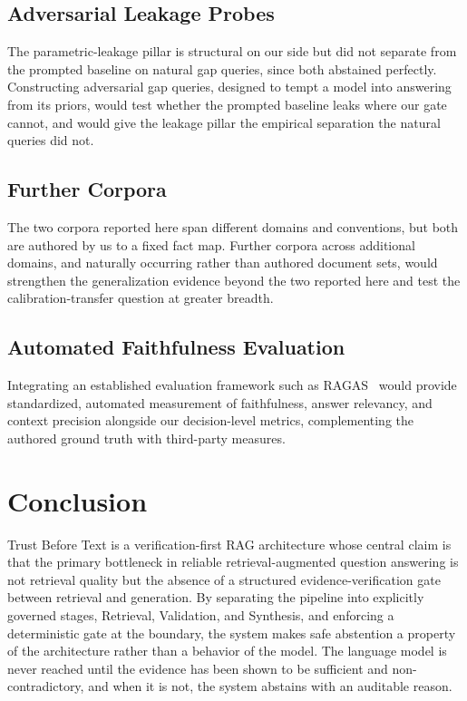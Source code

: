 \documentclass[conference]{IEEEtran}
\begin{document}
\subsection{Adversarial Leakage Probes}
The parametric-leakage pillar is structural on our side but did not separate
from the prompted baseline on natural gap queries, since both abstained
perfectly. Constructing adversarial gap queries, designed to tempt a model
into answering from its priors, would test whether the prompted baseline
leaks where our gate cannot, and would give the leakage pillar the empirical
separation the natural queries did not.

\subsection{Further Corpora}
The two corpora reported here span different domains and conventions, but both
are authored by us to a fixed fact map. Further corpora across additional
domains, and naturally occurring rather than authored document sets, would
strengthen the generalization evidence beyond the two reported here and test
the calibration-transfer question at greater breadth.

\subsection{Automated Faithfulness Evaluation}
Integrating an established evaluation framework such as
RAGAS~\cite{es2023ragas} would provide standardized, automated measurement
of faithfulness, answer relevancy, and context precision alongside our
decision-level metrics, complementing the authored ground truth with
third-party measures.

\section{Conclusion}
\label{sec:conclusion}

Trust Before Text is a verification-first RAG architecture whose central
claim is that the primary bottleneck in reliable retrieval-augmented
question answering is not retrieval quality but the absence of a structured
evidence-verification gate between retrieval and generation. By separating
the pipeline into explicitly governed stages, Retrieval, Validation, and
Synthesis, and enforcing a deterministic gate at the boundary, the system
makes safe abstention a property of the architecture rather than a behavior
of the model. The language model is never reached until the evidence has
been shown to be sufficient and non-contradictory, and when it is not, the
system abstains with an auditable reason.
\end{document}
